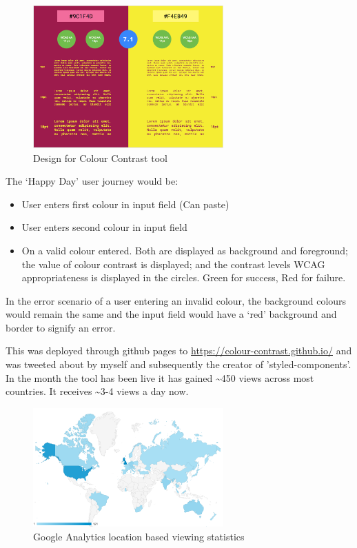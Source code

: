 \begin{figure}[H]
\centering
\includegraphics[width=0.65\textwidth]{figures/colour_contrast_1}
\captionsetup{justification=centering}
\caption{Design for Colour Contrast tool
\label{fig:colour_contrast_1}}
\end{figure}

The `Happy Day' user journey would be:
\begin{itemize}
\item User enters first colour in input field (Can paste)
\item User enters second colour in input field
\item On a valid colour entered. Both are displayed as background and
foreground; the value of colour contrast is displayed; and the contrast
levels WCAG appropriateness is displayed in the circles. Green for success, Red
for failure.
\end{itemize}

In the error scenario of a user entering an invalid colour, the background
colours would remain the same and the input field would have a `red'
background and border to signify an error.

This was deployed through github pages to \url{https://colour-contrast.github.io/}
and was tweeted about by myself and
subsequently the creator of 'styled-components'. In the month
the tool has been live it has gained \textasciitilde450 views across most
countries. It receives \textasciitilde3-4 views a day now.

\begin{figure}[H]
\centering
\includegraphics[width=0.65\textwidth]{figures/colour_contrast_analytics}
\captionsetup{justification=centering}
\caption{Google Analytics location based viewing statistics
\label{fig:colour_contrast_analytics}}
\end{figure}



